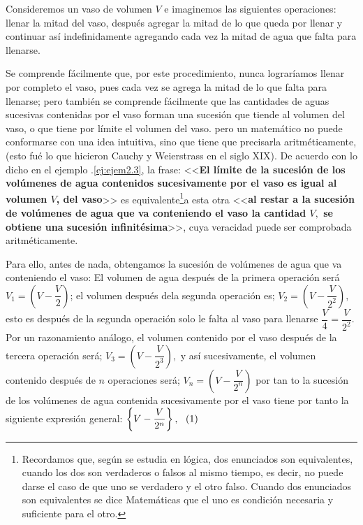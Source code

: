 \documentclass[oneside,english,spanish,2m,twoside,svgnames,x11names,HTML,twoside,12pt]{libro-matua}\usepackage[]{graphicx}\usepackage[]{color}
\def\myref#1{\textcolor{ptctitle}{\thesection .\ref{#1}}}
\newcommand{\inline}{\refstepcounter{equation}~~\mbox{(\theequation)}}%
\begin{document}
\begin{ejemplo}

Consideremos un vaso de volumen $V$ e imaginemos las siguientes operaciones:
llenar la mitad del vaso, después agregar la mitad de lo que queda
por llenar y continuar así indefinidamente agregando cada vez la mitad
de agua que falta para llenarse. 

\end{ejemplo}

\sol Se comprende fácilmente que, por este procedimiento, nunca lograríamos
llenar por completo el vaso, pues cada vez se agrega la mitad de lo
que falta para llenarse; pero también se comprende fácilmente que
las cantidades de aguas sucesivas contenidas por el vaso forman una
sucesión que tiende al volumen del vaso, o que tiene por límite el
volumen del vaso. pero un matemático no puede conformarse con una
idea intuitiva, sino que tiene que precisarla aritméticamente, (esto
fué lo que hicieron Cauchy y Weierstrass en el siglo XIX). De acuerdo
con lo dicho en el ejemplo \myref{ej:ejem2.3}, la frase: <<\textbf{El
límite de la sucesión de los volúmenes de agua contenidos sucesivamente
por el vaso es igual al volumen $V$, del vaso}>> es equivalente\footnote{Recordamos que, según se estudia en lógica, dos enunciados son equivalentes,
cuando los dos son verdaderos o falsos al mismo tiempo, es decir,
no puede darse el caso de que uno se verdadero y el otro falso. Cuando
dos enunciados son equivalentes se dice Matemáticas que el uno es
condición necesaria y suficiente para el otro.}a esta otra <<\textbf{al restar a la sucesión de volúmenes de agua
que va conteniendo el vaso la cantidad $V,$ se obtiene una sucesión
infinitésima}>>, cuya veracidad puede ser comprobada aritméticamente.

Para ello, antes de nada, obtengamos la sucesión de volúmenes de agua
que va conteniendo el vaso: El volumen de agua después de la primera
operación será $V_{1}=\left(V-\dfrac{V}{2}\right)$; el volumen después
dela segunda operación es; $V_{2}=\left(V-\dfrac{V}{2^{2}}\right),$
esto es después de la segunda operación solo le falta al vaso para
llenarse $\dfrac{V}{4}=\dfrac{V}{2^{2}}.$ Por un razonamiento análogo,
el volumen contenido por el vaso después de la tercera operación será;
$V_{3}=\left(V-\dfrac{V}{2^{3}}\right),$ y así sucesivamente, el
volumen contenido después de $n$ operaciones será; $V_{n}=\left(V-\dfrac{V}{2^{n}}\right)$
por tan to la sucesión de los volúmenes de agua contenida sucesivamente
por el vaso tiene por tanto la siguiente expresión general: $\left\{ V-\dfrac{V}{2^{n}}\right\} ,\inline\text{\label{eq:ec2.5}}$
\end{document}
